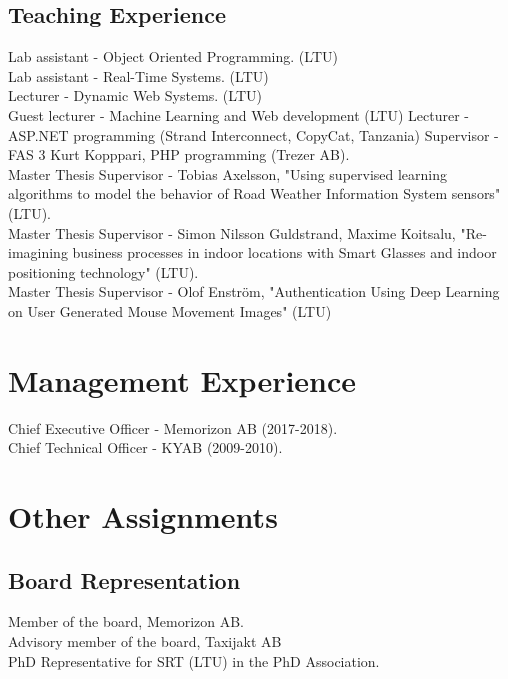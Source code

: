 \documentclass{article}
\begin{document}
\subsection{Teaching Experience}
Lab assistant - Object Oriented Programming. (LTU) \\
Lab assistant - Real-Time Systems. (LTU) \\
\newline
Lecturer - Dynamic Web Systems. (LTU) \\
Guest lecturer - Machine Learning and Web development (LTU)
Lecturer - ASP.NET programming (Strand Interconnect, CopyCat, Tanzania)
\newline
\newline
Supervisor - FAS 3 Kurt Kopppari, PHP programming (Trezer AB).\\
Master Thesis Supervisor - Tobias Axelsson, "Using supervised learning algorithms to model the behavior of Road Weather Information System sensors" (LTU). \\
\newline
Master Thesis Supervisor - Simon Nilsson Guldstrand, Maxime Koitsalu, "Re-imagining business processes in indoor locations with Smart Glasses and indoor positioning technology" (LTU). \\
Master Thesis Supervisor - Olof Enström, "Authentication Using Deep Learning on
User Generated Mouse Movement Images" (LTU)

\section{Management Experience}
Chief Executive Officer - Memorizon AB (2017-2018).\\
Chief Technical Officer - KYAB (2009-2010).

\section{Other Assignments}
\subsection{Board Representation}
Member of the board, Memorizon AB. \\
Advisory member of the board, Taxijakt AB\\
PhD Representative for SRT (LTU) in the PhD Association.
\end{document}
